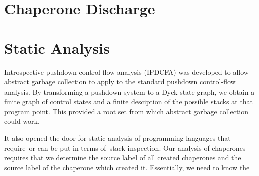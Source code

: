 \documentclass{sigplanconf}
\begin{document}

\section{Chaperone Discharge}




\section{Static Analysis}

Introspective pushdown control-flow analysis (IPDCFA) was developed to allow abstract garbage collection to apply to the standard pushdown control-flow analysis.
By transforming a pushdown system to a Dyck state graph, we obtain a finite graph of control states and a finite desciption of the possible stacks at that program point.
This provided a root set from which abstract garbage collection could work.

It also opened the door for static analysis of programming languages that require--or can be put in terms of--stack inspection.
Our analysis of chaperones requires that we determine the source label of all created chaperones and the source label of the chaperone which created it.
Essentially, we need to know the 
\end{document}
